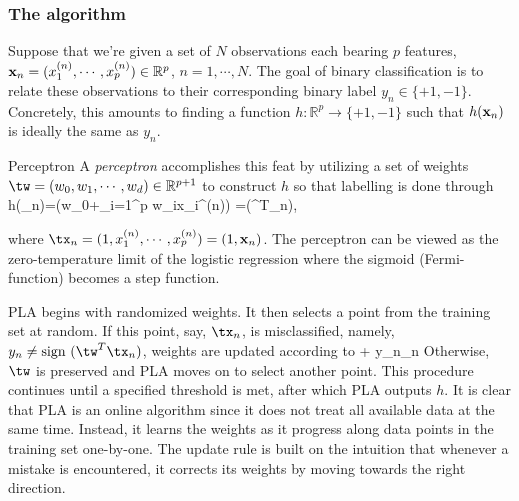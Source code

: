 \subsubsection{The algorithm}


Suppose that we're given a set of $N$ observations each bearing $p$ features, $\mathbf{x}_n=(x_1^{(n)},\cdots, x_p^{(n)})\in\mathbb{R}^p$, $n=1,\cdots, N$. The goal of binary classification is to relate these observations to their corresponding binary label $y_n \in\{+1,-1\}$. Concretely, this amounts to finding a function $h: \mathbb{R}^p\rightarrow \{+1,-1\}$ such that $h(\mathbf{x}_n)$ is ideally the same as $y_n$. 
\begin{mybox}{Perceptron} 
	A \emph{perceptron} accomplishes this feat by utilizing a set of weights $\tw=(w_0,w_1,\cdots, w_d)\in\mathbb{R}^{p+1}$ to construct $h$ so that labelling is done through
\be 
	h(\tx_n)=\left(w_0+\sum_{i=1}^p w_ix_i^{(n)}\right) =(\tw^T\tx_n),
	\ee 
	
	where $\tx_n=(1,x_1^{(n)},\cdots, x_p^{(n)}) = (1,\mx_n)$. The perceptron can be viewed as the zero-temperature limit of the logistic regression where the sigmoid (Fermi-function) becomes a step function.
	
\end{mybox}

PLA begins with randomized weights. It then selects a point from the training set at random. If this point, say, $\tx_n$, is misclassified, namely, $y_n\neq \text{sign }(\tw^T\tx_n)$, weights are updated according to 
\be 
\tw\leftarrow \tw+ y_n\tx_n
\ee 
Otherwise, $\tw$ is preserved and PLA moves on to select another point. This procedure continues until a specified threshold is met, after which PLA outputs $h$. It is clear that PLA is an online algorithm since it does not treat all available data at the same time. Instead, it learns the weights as it progress along data points in the training set one-by-one. The update rule is built on the intuition that whenever a mistake is encountered, it corrects its weights by moving towards the right direction. 












